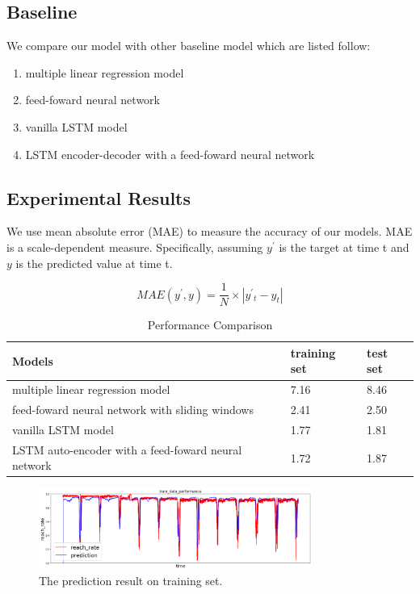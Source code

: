 \documentclass[5p]{elsarticle}
\begin{document}
\subsection{Baseline}
We compare our model with other baseline model which are listed follow:
\begin{enumerate}
  \item multiple linear regression model
  \item feed-foward neural network
  \item vanilla LSTM model
  \item LSTM encoder-decoder with a feed-foward neural network
\end{enumerate}

\subsection{Experimental Results}

We use mean absolute error (MAE) to measure the accuracy of our models. MAE is a scale-dependent measure. Specifically, assuming $y^'$ is the target at time t and $y$ is the predicted value at time t. 



\begin{equation}
	 MAE(y^{'},y)=\frac{1}{N}\times\left| y^{'}{_t}-y_t \right|
\end{equation}


\begin{table}[]
\centering
\caption{Performance Comparison}
\label{my-label}
\begin{tabular}{|l|l|l|}
\hline
Models & training set  & test set\\
\hline
multiple linear regression model 
& 7.16  & 8.46 \\
\hline
feed-foward neural network with sliding windows 
& 2.41  & 2.50 \\
\hline
vanilla LSTM model
& 1.77 & 1.81  \\
\hline
LSTM auto-encoder with a feed-foward neural network & 
1.72 &  1.87 \\
\hline    
\end{tabular}
\end{table}


\begin{figure}[h]
    \centering
    \includegraphics[width=0.8\textwidth]{result_training_set.png}
    \caption{The prediction result on training set.}
    \label{fig:result_training_set}
\end{figure}
\end{document}
